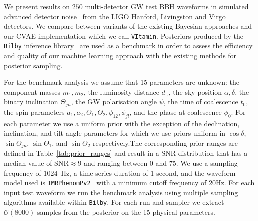 \documentclass[%
showpacs,
nofootinbib,
 amsmath,amssymb,
 aps,
 twocolumn,
 prl,
 reprint,
floatfix,
]{revtex4-1}
\begin{document}
%
%

%
%
%
%
We present results on $250$ multi-detector \ac{GW} test \ac{BBH}
waveforms in simulated advanced detector noise~\cite{aligo_noisecurves}
from the LIGO Hanford, Livingston and Virgo detectors. We compare between
variants of the existing Bayesian approaches and our \ac{CVAE} implementation
which we call \texttt{VItamin}. Posteriors produced by the \texttt{Bilby}
inference library~\cite{1811.02042} are used as a benchmark in order to assess
the efficiency and quality of our machine learning approach with the existing
methods for posterior sampling.

%
%
For the benchmark analysis we assume that 15 parameters are
unknown: the component masses
$m_1,m_2$, the luminosity distance $d_{\text{L}}$, the sky position
$\alpha,\delta$, the binary inclination $\Theta_{jn}$, the \ac{GW} polarisation
angle ${\psi}$, the time of coalescence $t_{0}$, the spin parameters $a_1,a_2,
\Theta_1,\Theta_2,\phi_{12},\phi_{jl}$, and the phase at coalescence
$\phi_0$. For each parameter we use a uniform prior with the exception of 
the declination, inclination, and tilt angle parameters for 
which we use priors uniform in $\cos\delta$, $\sin\Theta_{jn}$, $\sin\Theta_1$, 
and $\sin\Theta_2$ respectively.The corresponding prior ranges
are defined in Table~\ref{tab:prior_ranges} and result in a  \ac{SNR}
distribution that has a median value of $\text{SNR}\approx 9$ and ranging between 0 and 75.
We use a sampling frequency of $1024$~Hz, a time-series duration of 1 second, and
the waveform model used is \texttt{IMRPhenomPv2}~\cite{1809.10113} with a
minimum cutoff frequency of $20$Hz. For each input test waveform we run the
benchmark analysis using multiple sampling algorithms available within
\texttt{Bilby}. For each run and sampler we extract $\mathcal{O}(8000)$
samples from the posterior on the 15 physical parameters.  
\end{document}
